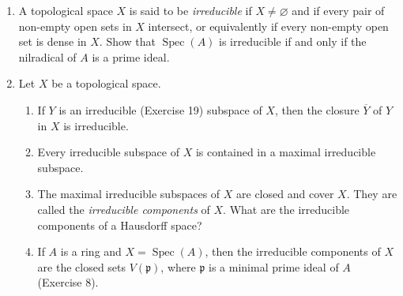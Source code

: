 \begin{enumerate}
\item A topological space $X$ is said to be \textit{irreducible} if $X\neq\varnothing$ and if every pair of non-empty open sets in $X$ intersect, or equivalently if every non-empty open set is dense in $X$. Show that $\operatorname{Spec}(A)$ is irreducible if and only if the nilradical of $A$ is a prime ideal.

\item Let $X$ be a topological space.
\begin{enumerate}
\renewcommand{\labelenumii}{\roman{enumii})}
\item If $Y$ is an irreducible (Exercise 19) subspace of $X$, then the closure $\overline Y$ of $Y$ in $X$ is irreducible.
\item Every irreducible subspace of $X$ is contained in a maximal irreducible subspace.
\item The maximal irreducible subspaces of $X$ are closed and cover $X$. They are called the \textit{irreducible components} of $X$. What are the irreducible components of a Hausdorff space?
\item If $A$ is a ring and $X=\operatorname{Spec}(A)$, then the irreducible components of $X$ are the closed sets $V(\mathfrak p)$, where $\mathfrak p$ is a minimal prime ideal of $A$ (Exercise 8).
\end{enumerate}


\end{enumerate}
